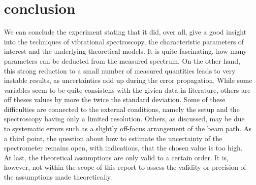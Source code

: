 \section{conclusion}
We can conclude the experiment stating that it did, over all, give a good 
insight into the techniques of vibrational spectroscopy, the 
characteristic parameters of interest and the underlying 
theoretical models. 
It is quite fascinating, how many parameters 
can be deducted from the measured spectrum. 
On the other hand, this strong reduction to a small number of 
measured quantities leads to very instable results, as uncertainties 
add up during the error propagation. While some variables seem 
to be quite consistens with the givien data in literature, others 
are off theses values by more the twice the standard deviation. 
Some of these difficulties are connected to the external conditions, 
namely the setup and the spectroscopy having only a limited resolution. 
Others, as discussed, may be due to systematic errors such as a 
slightly off-focus arrangement of the beam path. As a third point, 
the question about how to estimate the uncertainty of the spectrometer 
remains open, with indications, that the chosen value is too high. 
At last, the theoretical assumptions are only valid to a certain order. 
It is, however, not within the scope of this report to assess the validity or precision of 
the assumptions made theoretically.




